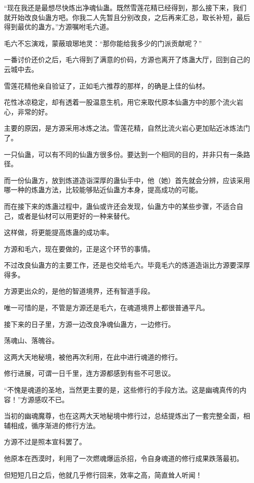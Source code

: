\begin{this_body}
“现在我还是最想尽快炼出净魂仙蛊。既然雪莲花精已经得到，那么接下来，我们就开始改良仙蛊方吧。你我二人先暂且分别改良，之后再来汇总，取长补短，最后得到最优的蛊方。”方源嘱咐毛六道。

毛六不忘演戏，蒙蔽琅琊地灵：“那你能给我多少的门派贡献呢？”

一番讨价还价之后，毛六得到了满意的价码，方源也离开了炼蛊大厅，回到自己的云城中去。

雪莲花精他亲自验证了，正如毛六推荐的那样，的确是上佳的仙材。

花性冰凉稳定，却有透着一股温意生机，用它来取代原本仙蛊方中的那个流火岩心，非常的好。

主要的原因，是方源采用冰炼之法。雪莲花精，自然比流火岩心更加贴近冰炼法门了。

一只仙蛊，可以有不同的仙蛊方很多份。要达到一个相同的目的，并非只有一条路径。

而一份仙蛊方，放到炼道造诣深厚的蛊仙手中，他（她）首先就会分辨，应该采用哪一种的炼蛊方法，比较能够贴近仙蛊方本身，提高成功的可能。

而在接下来的炼蛊过程中，蛊仙或许还会发现，仙蛊方中的某些步骤，不适合自己，或者是仙材可以用更好的一种来替代。

这样做，将更能提高炼蛊的成功率。

方源和毛六，现在要做的，正是这个环节的事情。

不过改良仙蛊方的主要工作，还是也交给毛六。毕竟毛六的炼道造诣比方源要深厚得多。

方源更出众的，是他的智道境界，还有智道手段。

唯一可惜的是，不管是方源还是毛六，在魂道境界上都很普通平凡。

接下来的日子里，方源一边改良净魂仙蛊方，一边修行。

荡魂山、落魄谷。

这两大天地秘境，被他再次利用，在此中进行魂道的修行。

修行进展，可谓一日千里，连方源都感到有些不可思议。

“不愧是魂道的圣地，当然更主要的是，这些修行的手段方法。这是幽魂真传的内容！”方源感叹不已。

当初的幽魂魔尊，也在这两大天地秘境中修行过，总结提炼出了一套完整全面，相辅相成，循序渐进的修行方法。

方源不过是照本宣科罢了。

他原本在西漠时，利用了一次燃魂爆运杀招，令自身魂道的修行成果跌落最初。

但短短几日之后，他就几乎修行回来，效率之高，简直耸人听闻！


\end{this_body}
